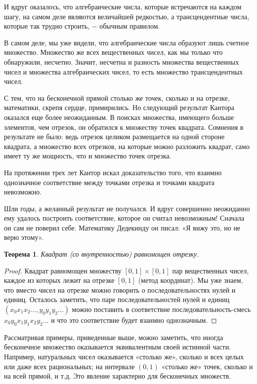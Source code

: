 \documentclass{article}
\newtheorem{theorem}{Теорема}[section]
\begin{document}
И вдруг оказалось, что алгебраические числа, которые встречаются на каждом шагу, на самом деле являются величайшей редкостью, а трансцендентные числа, которые так трудно строить, \(-\) обычным правилом.

В самом деле, мы уже видели, что алгебраические числа образуют лишь счетное множество. Множество же всех вещественных чисел, как мы только что обнаружили, несчетно. Значит, несчетна и разность множества вещественных чисел и множества алгебраических чисел, то есть множество трансцендентных чисел. \newline

С тем, что на бесконечной прямой столько же точек, сколько и на отрезке, математики, скрепя сердце, примирились. Но следующий результат Кантора оказался еще более неожиданным. В поисках множества, имеющего больше элементов, чем отрезок, он обратился к множеству точек квадрата. Сомнения в результате не было: ведь отрезок целиком размещается на одной стороне квадрата, а множество всех отрезков, на которые можно разложить квадрат, само имеет ту же мощность, что и множество точек отрезка.

На протяжении трех лет Кантор искал доказательство того, что взаимно однозначное соответствие между точками отрезка и точками квадрата невозможно.

Шли годы, а желанный результат не получался. И вдруг совершенно неожиданно ему удалось построить соответствие, которое он считал невозможным! Сначала он сам не поверил себе. Математику Дедекинду он писал: «Я вижу это, но не верю этому».

\begin{theorem}
Квадрат (со внутренностью) равномощен отрезку.
\end{theorem}

\begin{proof}
Квадрат равномощен множеству \([0, 1] \times [0, 1]\) пар вещественных чисел, каждое из которых лежит на отрезке \([0, 1]\) (метод координат). Мы уже знаем, что вместо чисел на отрезке можно говорить о последовательностях нулей и единиц. Осталось заметить, что паре последовательностей нулей и единиц \((x_0x_1x_2..., y_0y_1y_2...)\) можно поставить в соответствие последовательность-смесь \(x_0y_0x_1y_1x_2y_2...\) и что это соответствие будет взаимно однозначным.
\end{proof}

Рассматривая примеры, приведенные выше, можно заметить, что иногда бесконечное множество оказывается эквивалентным своей истинной части. Например, натуральных чисел оказывается «столько же», сколько и всех целых или даже всех рациональных; на интервале \((0, 1)\) «столько же» точек, сколько и на всей прямой, и т.д. Это явление характерно для бесконечных множеств.
\end{document}
